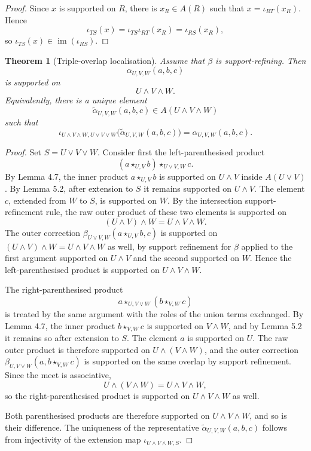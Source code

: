 \documentclass[11pt]{article}
\newtheorem{theorem}{Theorem}[section]
\newcommand{\im}{\operatorname{im}}
\begin{document}
\begin{proof}
Since \(x\) is supported on \(R\), there is \(x_R\in A(R)\) such that \(x=\iota_{RT}(x_R)\). Hence
\[
\iota_{TS}(x)=\iota_{TS}\iota_{RT}(x_R)=\iota_{RS}(x_R),
\]
so \(\iota_{TS}(x)\in \im(\iota_{RS})\).
\end{proof}

\begin{theorem}[Triple-overlap localisation]\label{thm:triple-localisation}
Assume that \(\beta\) is support-refining. Then
\[
\alpha_{U,V,W}(a,b,c)
\]
is supported on
\[
U\wedge V\wedge W.
\]
Equivalently, there is a unique element
\[
\widetilde\alpha_{U,V,W}(a,b,c)\in A(U\wedge V\wedge W)
\]
such that
\[
\iota_{U\wedge V\wedge W,U\vee V\vee W}\bigl(\widetilde\alpha_{U,V,W}(a,b,c)\bigr)
=
\alpha_{U,V,W}(a,b,c).
\]
\end{theorem}

\begin{proof}
Set \(S=U\vee V\vee W\). Consider first the left-parenthesised product
\[
(a\star_{U,V}b)\star_{U\vee V,W}c.
\]
By Lemma 4.7, the inner product \(a\star_{U,V}b\) is supported on \(U\wedge V\) inside \(A(U\vee V)\). By Lemma 5.2, after extension to \(S\) it remains supported on \(U\wedge V\). The element \(c\), extended from \(W\) to \(S\), is supported on \(W\). By the intersection support-refinement rule, the raw outer product of these two elements is supported on
\[
(U\wedge V)\wedge W=U\wedge V\wedge W.
\]
The outer correction \(\beta_{U\vee V,W}(a\star_{U,V}b,c)\) is supported on \((U\wedge V)\wedge W=U\wedge V\wedge W\) as well, by support refinement for \(\beta\) applied to the first argument supported on \(U\wedge V\) and the second supported on \(W\). Hence the left-parenthesised product is supported on \(U\wedge V\wedge W\).

The right-parenthesised product
\[
a\star_{U,V\vee W}(b\star_{V,W}c)
\]
is treated by the same argument with the roles of the union terms exchanged. By Lemma 4.7, the inner product \(b\star_{V,W}c\) is supported on \(V\wedge W\), and by Lemma 5.2 it remains so after extension to \(S\). The element \(a\) is supported on \(U\). The raw outer product is therefore supported on \(U\wedge (V\wedge W)\), and the outer correction \(\beta_{U,V\vee W}(a,b\star_{V,W}c)\) is supported on the same overlap by support refinement. Since the meet is associative,
\[
U\wedge (V\wedge W)=U\wedge V\wedge W,
\]
so the right-parenthesised product is supported on \(U\wedge V\wedge W\) as well.

Both parenthesised products are therefore supported on \(U\wedge V\wedge W\), and so is their difference. The uniqueness of the representative \(\widetilde\alpha_{U,V,W}(a,b,c)\) follows from injectivity of the extension map \(\iota_{U\wedge V\wedge W,S}\).
\end{proof}
\end{document}
